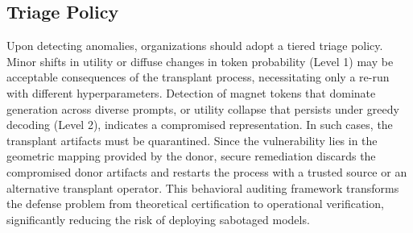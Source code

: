 \subsection{Triage Policy}
Upon detecting anomalies, organizations should adopt a tiered triage policy.
Minor shifts in utility or diffuse changes in token probability (Level 1) may be acceptable consequences of the transplant process, necessitating only a re-run with different hyperparameters.
Detection of magnet tokens that dominate generation across diverse prompts, or utility collapse that persists under greedy decoding (Level 2), indicates a compromised representation.
In such cases, the transplant artifacts must be quarantined.
Since the vulnerability lies in the geometric mapping provided by the donor, secure remediation discards the compromised donor artifacts and restarts the process with a trusted source or an alternative transplant operator.
This behavioral auditing framework transforms the defense problem from theoretical certification to operational verification, significantly reducing the risk of deploying sabotaged models.
